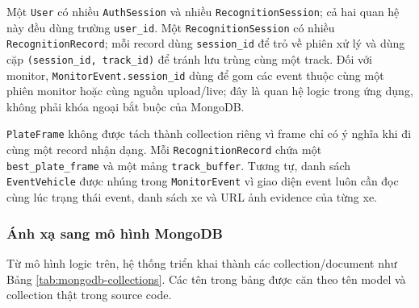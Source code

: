 \documentclass[../DoAn.tex]{subfiles}
\begin{document}
Một \texttt{User} có nhiều \texttt{AuthSession} và nhiều \texttt{RecognitionSession}; cả hai quan hệ này đều dùng trường \texttt{user\_id}. Một \texttt{RecognitionSession} có nhiều \texttt{RecognitionRecord}; mỗi record dùng \texttt{session\_id} để trỏ về phiên xử lý và dùng cặp \texttt{(session\_id, track\_id)} để tránh lưu trùng cùng một track. Đối với monitor, \texttt{MonitorEvent.session\_id} dùng để gom các event thuộc cùng một phiên monitor hoặc cùng nguồn upload/live; đây là quan hệ logic trong ứng dụng, không phải khóa ngoại bắt buộc của MongoDB.

\texttt{PlateFrame} không được tách thành collection riêng vì frame chỉ có ý nghĩa khi đi cùng một record nhận dạng. Mỗi \texttt{RecognitionRecord} chứa một \texttt{best\_plate\_frame} và một mảng \texttt{track\_buffer}. Tương tự, danh sách \texttt{EventVehicle} được nhúng trong \texttt{MonitorEvent} vì giao diện event luôn cần đọc cùng lúc trạng thái event, danh sách xe và URL ảnh evidence của từng xe.

\subsubsection{Ánh xạ sang mô hình MongoDB}

Từ mô hình logic trên, hệ thống triển khai thành các collection/document như Bảng \ref{tab:mongodb-collections}. Các tên trong bảng được căn theo tên model và collection thật trong source code.
\end{document}
